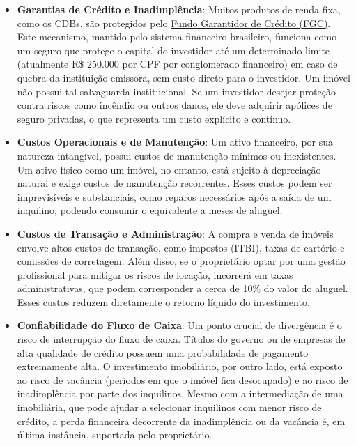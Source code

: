 \documentclass[
  a4paper,
]{book}
\begin{document}
\begin{itemize}
\item
  \textbf{Garantias de Crédito e Inadimplência}: Muitos produtos de
  renda fixa, como os CDBs, são protegidos pelo
  \href{https://www.bb.com.br/site/investimentos/fgc/}{Fundo Garantidor
  de Crédito (FGC)}. Este mecanismo, mantido pelo sistema financeiro
  brasileiro, funciona como um seguro que protege o capital do
  investidor até um determinado limite (atualmente R\$ 250.000 por CPF
  por conglomerado financeiro) em caso de quebra da instituição
  emissora, sem custo direto para o investidor. Um imóvel não possui tal
  salvaguarda institucional. Se um investidor desejar proteção contra
  riscos como incêndio ou outros danos, ele deve adquirir apólices de
  seguro privadas, o que representa um custo explícito e contínuo.
\item
  \textbf{Custos Operacionais e de Manutenção}: Um ativo financeiro, por
  sua natureza intangível, possui custos de manutenção mínimos ou
  inexistentes. Um ativo físico como um imóvel, no entanto, está sujeito
  à depreciação natural e exige custos de manutenção recorrentes. Esses
  custos podem ser imprevisíveis e substanciais, como reparos
  necessários após a saída de um inquilino, podendo consumir o
  equivalente a meses de aluguel.
\item
  \textbf{Custos de Transação e Administração}: A compra e venda de
  imóveis envolve altos custos de transação, como impostos (ITBI), taxas
  de cartório e comissões de corretagem. Além disso, se o proprietário
  optar por uma gestão profissional para mitigar os riscos de locação,
  incorrerá em taxas administrativas, que podem corresponder a cerca de
  10\% do valor do aluguel. Esses custos reduzem diretamente o retorno
  líquido do investimento.
\item
  \textbf{Confiabilidade do Fluxo de Caixa}: Um ponto crucial de
  divergência é o risco de interrupção do fluxo de caixa. Títulos do
  governo ou de empresas de alta qualidade de crédito possuem uma
  probabilidade de pagamento extremamente alta. O investimento
  imobiliário, por outro lado, está exposto ao risco de vacância
  (períodos em que o imóvel fica desocupado) e ao risco de inadimplência
  por parte dos inquilinos. Mesmo com a intermediação de uma
  imobiliária, que pode ajudar a selecionar inquilinos com menor risco
  de crédito, a perda financeira decorrente da inadimplência ou da
  vacância é, em última instância, suportada pelo proprietário.
\end{itemize}
\end{document}
